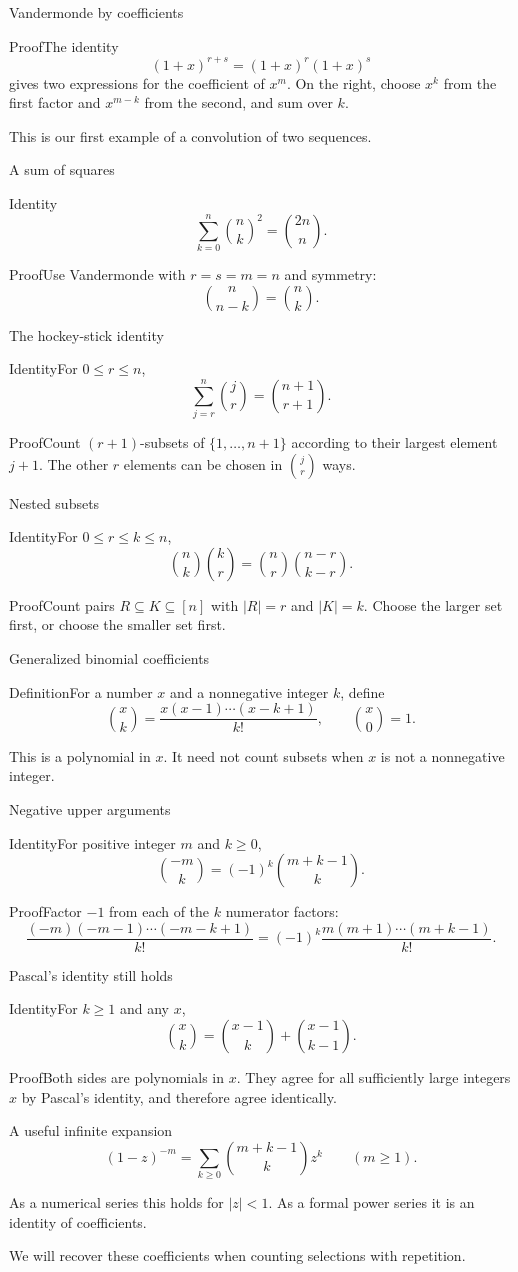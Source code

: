 \documentclass[aspectratio=169,11pt]{beamer}
\newcommand{\Def}[2]{\begin{block}{#1}#2\end{block}}
\newcommand{\Thm}[2]{\begin{block}{#1}#2\end{block}}
\renewcommand{\Proof}[1]{\begin{block}{Proof}\normalsize #1\end{block}}
\newcommand{\gap}{\par\medskip}
\begin{document}
\begin{frame}{Vandermonde by coefficients}
\large
\Proof{The identity
\[(1+x)^{r+s}=(1+x)^r(1+x)^s\]
gives two expressions for the coefficient of $x^m$. On the right, choose $x^k$ from the first factor and $x^{m-k}$ from the second, and sum over $k$.}
\gap This is our first example of a convolution of two sequences.
\end{frame}
\begin{frame}{A sum of squares}
\large
\Thm{Identity}{\[\sum_{k=0}^n\binom nk^2=\binom{2n}n.\]}
\Proof{Use Vandermonde with $r=s=m=n$ and symmetry:
\[\binom n{n-k}=\binom nk.\]}
\end{frame}
\begin{frame}{The hockey-stick identity}
\large
\Thm{Identity}{For $0\leq r\leq n$,
\[\sum_{j=r}^n\binom jr=\binom{n+1}{r+1}.\]}
\Proof{Count $(r+1)$-subsets of $\{1,\ldots,n+1\}$ according to their largest element $j+1$. The other $r$ elements can be chosen in $\binom jr$ ways.}
\end{frame}
\begin{frame}{Nested subsets}
\large
\Thm{Identity}{For $0\leq r\leq k\leq n$,
\[\binom nk\binom kr=\binom nr\binom{n-r}{k-r}.\]}
\Proof{Count pairs $R\subseteq K\subseteq[n]$ with $|R|=r$ and $|K|=k$. Choose the larger set first, or choose the smaller set first.}
\end{frame}
\begin{frame}{Generalized binomial coefficients}
\large
\Def{Definition}{For a number $x$ and a nonnegative integer $k$, define
\[\binom xk=\frac{x(x-1)\cdots(x-k+1)}{k!},\qquad\binom x0=1.\]}
\gap This is a polynomial in $x$. It need not count subsets when $x$ is not a nonnegative integer.
\end{frame}
\begin{frame}{Negative upper arguments}
\large
\Thm{Identity}{For positive integer $m$ and $k\geq0$,
\[\binom{-m}k=(-1)^k\binom{m+k-1}k.\]}
\Proof{Factor $-1$ from each of the $k$ numerator factors:
\[\frac{(-m)(-m-1)\cdots(-m-k+1)}{k!}
=(-1)^k\frac{m(m+1)\cdots(m+k-1)}{k!}.\]}
\end{frame}
\begin{frame}{Pascal's identity still holds}
\large
\Thm{Identity}{For $k\geq1$ and any $x$,
\[\binom xk=\binom{x-1}k+\binom{x-1}{k-1}.\]}
\Proof{Both sides are polynomials in $x$. They agree for all sufficiently large integers $x$ by Pascal's identity, and therefore agree identically.}
\end{frame}
\begin{frame}{A useful infinite expansion}
\large
\[(1-z)^{-m}=\sum_{k\geq0}\binom{m+k-1}kz^k\qquad(m\geq1).\]
\gap As a numerical series this holds for $|z|<1$. As a formal power series it is an identity of coefficients.
\gap We will recover these coefficients when counting selections with repetition.
\end{frame}
\end{document}
